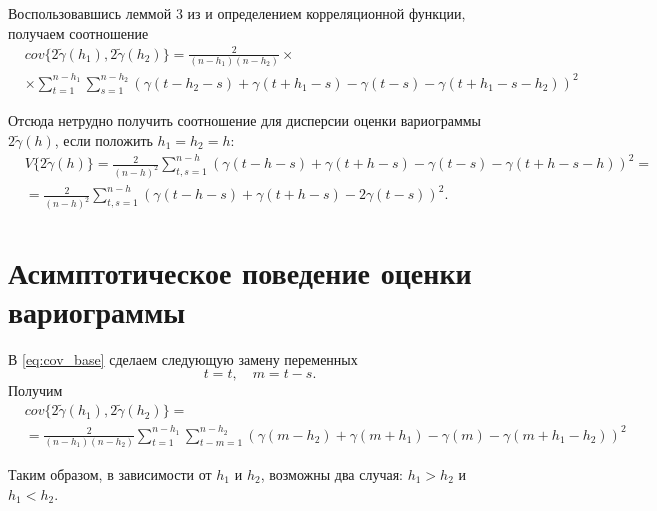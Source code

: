 Воспользовавшись леммой 3 из \cite{tsekhavaya-brest} и определением корреляционной функции, получаем соотношение
\begin{eqnarray}
\nonumber
\label{eq:cov_base}
	& cov\{ 2 \tilde{\gamma}(h_1), 2 \tilde{\gamma}(h_2) \} = \frac{2}{(n - h_1)(n - h_2)} \times \\
	& \times \sum_{t = 1}^{n - h_1}\sum_{s = 1}^{n - h_2} (\gamma(t - h_2 - s) + \gamma(t + h_1 - s) - \gamma(t - s) - \gamma(t + h_1 - s - h_2))^2
\end{eqnarray}

Отсюда нетрудно получить соотношение для дисперсии оценки вариограммы $ 2 \tilde{\gamma}(h) $, если положить $ h_1 = h_2 = h $:
\begin{eqnarray*}
\nonumber
	& V \{ 2 \tilde{\gamma}(h) \} = \frac{2}{(n - h)^2}\sum_{t,s = 1}^{n - h} ( \gamma(t - h - s) + \gamma(t + h - s) - \gamma(t - s) - \gamma(t + h - s - h) )^2 = \\
	& = \frac{2}{(n-h)^2}\sum_{t,s = 1}^{n - h} ( \gamma(t - h - s) + \gamma(t + h - s) - 2\gamma(t - s) )^2.
\end{eqnarray*}


\section{Асимптотическое поведение оценки вариограммы} %
\label{sec:new_section}

В \eqref{eq:cov_base} сделаем следующую замену переменных
\begin{equation*}
	t = t, \quad m = t - s.
\end{equation*}
Получим
\begin{eqnarray}
\nonumber
\label{eq:cov_split}
	& cov\{ 2 \tilde{\gamma}(h_1), 2 \tilde{\gamma}(h_2) \} = \\
	& = \frac{2}{(n - h_1) (n - h_2)} \sum_{t = 1}^{n - h_1}\sum_{t - m = 1}^{n - h_2} (\gamma(m - h_2) + \gamma(m + h_1) - \gamma(m) - \gamma(m + h_1 - h_2))^2
\end{eqnarray}

Таким образом, в зависимости от $h_1$ и $h_2$, возможны два случая: $h_1 > h_2$ и $h_1 < h_2$.

